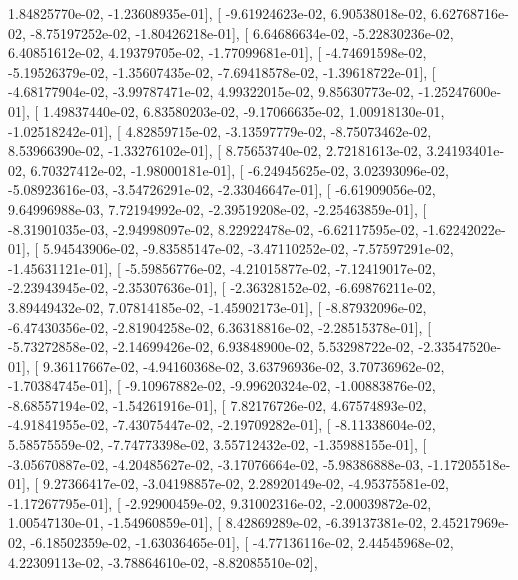 \documentclass{article}
\begin{document}
          1.84825770e-02,  -1.23608935e-01],
       [ -9.61924623e-02,   6.90538018e-02,   6.62768716e-02,
         -8.75197252e-02,  -1.80426218e-01],
       [  6.64686634e-02,  -5.22830236e-02,   6.40851612e-02,
          4.19379705e-02,  -1.77099681e-01],
       [ -4.74691598e-02,  -5.19526379e-02,  -1.35607435e-02,
         -7.69418578e-02,  -1.39618722e-01],
       [ -4.68177904e-02,  -3.99787471e-02,   4.99322015e-02,
          9.85630773e-02,  -1.25247600e-01],
       [  1.49837440e-02,   6.83580203e-02,  -9.17066635e-02,
          1.00918130e-01,  -1.02518242e-01],
       [  4.82859715e-02,  -3.13597779e-02,  -8.75073462e-02,
          8.53966390e-02,  -1.33276102e-01],
       [  8.75653740e-02,   2.72181613e-02,   3.24193401e-02,
          6.70327412e-02,  -1.98000181e-01],
       [ -6.24945625e-02,   3.02393096e-02,  -5.08923616e-03,
         -3.54726291e-02,  -2.33046647e-01],
       [ -6.61909056e-02,   9.64996988e-03,   7.72194992e-02,
         -2.39519208e-02,  -2.25463859e-01],
       [ -8.31901035e-03,  -2.94998097e-02,   8.22922478e-02,
         -6.62117595e-02,  -1.62242022e-01],
       [  5.94543906e-02,  -9.83585147e-02,  -3.47110252e-02,
         -7.57597291e-02,  -1.45631121e-01],
       [ -5.59856776e-02,  -4.21015877e-02,  -7.12419017e-02,
         -2.23943945e-02,  -2.35307636e-01],
       [ -2.36328152e-02,  -6.69876211e-02,   3.89449432e-02,
          7.07814185e-02,  -1.45902173e-01],
       [ -8.87932096e-02,  -6.47430356e-02,  -2.81904258e-02,
          6.36318816e-02,  -2.28515378e-01],
       [ -5.73272858e-02,  -2.14699426e-02,   6.93848900e-02,
          5.53298722e-02,  -2.33547520e-01],
       [  9.36117667e-02,  -4.94160368e-02,   3.63796936e-02,
          3.70736962e-02,  -1.70384745e-01],
       [ -9.10967882e-02,  -9.99620324e-02,  -1.00883876e-02,
         -8.68557194e-02,  -1.54261916e-01],
       [  7.82176726e-02,   4.67574893e-02,  -4.91841955e-02,
         -7.43075447e-02,  -2.19709282e-01],
       [ -8.11338604e-02,   5.58575559e-02,  -7.74773398e-02,
          3.55712432e-02,  -1.35988155e-01],
       [ -3.05670887e-02,  -4.20485627e-02,  -3.17076664e-02,
         -5.98386888e-03,  -1.17205518e-01],
       [  9.27366417e-02,  -3.04198857e-02,   2.28920149e-02,
         -4.95375581e-02,  -1.17267795e-01],
       [ -2.92900459e-02,   9.31002316e-02,  -2.00039872e-02,
          1.00547130e-01,  -1.54960859e-01],
       [  8.42869289e-02,  -6.39137381e-02,   2.45217969e-02,
         -6.18502359e-02,  -1.63036465e-01],
       [ -4.77136116e-02,   2.44545968e-02,   4.22309113e-02,
         -3.78864610e-02,  -8.82085510e-02],
\end{document}
